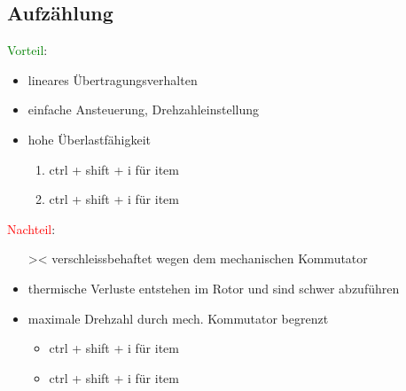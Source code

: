 \subsection{Aufzählung}
\textcolor{green}{Vorteil}:
\begin{itemize} 
    \item lineares Übertragungsverhalten
    \item einfache Ansteuerung, Drehzahleinstellung
    \item hohe Überlastfähigkeit
    \begin{enumerate}
        \item ctrl + shift + i für item
        \item ctrl + shift + i für item
    \end{enumerate}
\end{itemize}
\textcolor{red}{Nachteil}:
\begin{itemize}
    \item[><] verschleissbehaftet wegen dem mechanischen Kommutator
    \item thermische Verluste entstehen im Rotor und sind schwer abzuführen
    \item maximale Drehzahl durch mech. Kommutator begrenzt
    \begin{itemize}
        \item ctrl + shift + i für item
        \item ctrl + shift + i für item
    \end{itemize}
\end{itemize}